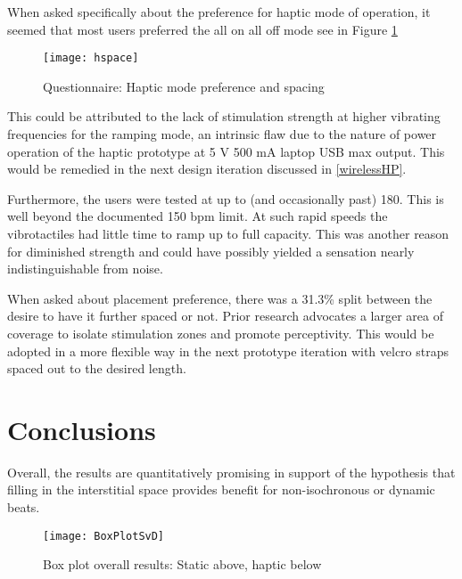 When asked specifically about the preference for haptic mode of operation, it seemed that most users preferred the all on all off mode see in Figure \ref{fig:hspace}
\begin{figure}[H]
    \centering
    \texttt{[image: hspace]}
    \caption{Questionnaire: Haptic mode preference and spacing}
    \label{fig:hspace}
\end{figure}

This could be attributed to the lack of stimulation strength at higher vibrating frequencies for the ramping mode, an intrinsic flaw due to the nature of power operation of the haptic prototype at 5 V 500 mA laptop USB max output. This would be remedied in the next design iteration discussed in \ref{wirelessHP}. 

Furthermore, the users were tested at up to (and occasionally past) 180. This is well beyond the documented 150 bpm limit. At such rapid speeds the vibrotactiles had little time to ramp up to full capacity. This was another reason for diminished strength and could have possibly yielded a sensation nearly indistinguishable from noise.

When asked about placement preference, there was a 31.3\% split between the desire to have it further spaced or not. Prior research advocates a larger area of coverage to isolate stimulation zones and promote perceptivity. This would be adopted in a more flexible way in the next prototype iteration with velcro straps spaced out to the desired length.

\section{Conclusions}
Overall, the results are quantitatively promising in support of the hypothesis that filling in the interstitial space provides benefit for non-isochronous or dynamic beats.
\begin{figure} \label{fig:BoxPlotSvD}
    \centering
    \texttt{[image: BoxPlotSvD]}
    \caption{Box plot overall results: Static above, haptic below}
\end{figure}